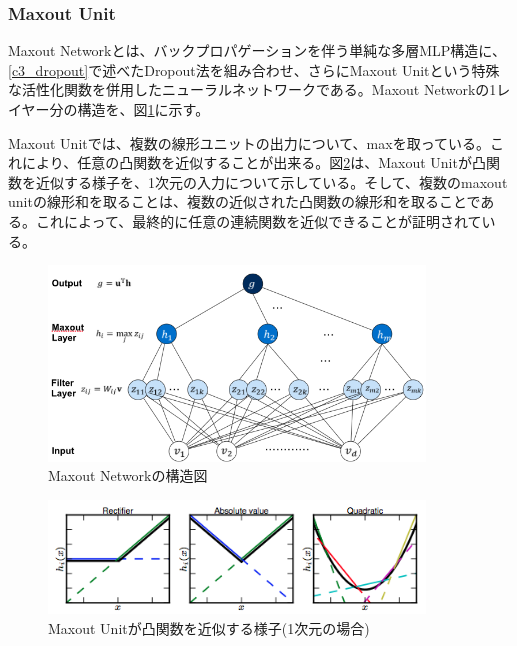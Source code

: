 \subsubsection{Maxout Unit}
Maxout Networkとは、バックプロパゲーションを伴う単純な多層MLP構造に、\ref{c3_dropout}で述べたDropout法を組み合わせ、さらにMaxout Unitという特殊な活性化関数を併用したニューラルネットワークである\cite{goodfellow2013maxout}。Maxout Networkの1レイヤー分の構造を、図\ref{c3_maxout_arch}に示す。\par
Maxout Unitでは、複数の線形ユニットの出力について、maxを取っている。これにより、任意の凸関数を近似することが出来る。図\ref{c3_maxout_app}は、Maxout Unitが凸関数を近似する様子を、1次元の入力について示している。そして、複数のmaxout unitの線形和を取ることは、複数の近似された凸関数の線形和を取ることである。これによって、最終的に任意の連続関数を近似できることが証明されている。
\begin{figure}[tbp]
 \begin{center}
  \includegraphics[width=100mm]{img/c3/maxout_arch}
 \end{center}
 \caption{Maxout Networkの構造図}
 \label{c3_maxout_arch}
\end{figure}
\begin{figure}[tbp]
 \begin{center}
  \includegraphics[width=100mm]{img/c3/maxout_app}
 \end{center}
 \caption{Maxout Unitが凸関数を近似する様子(1次元の場合)}
 \label{c3_maxout_app}
\end{figure}
